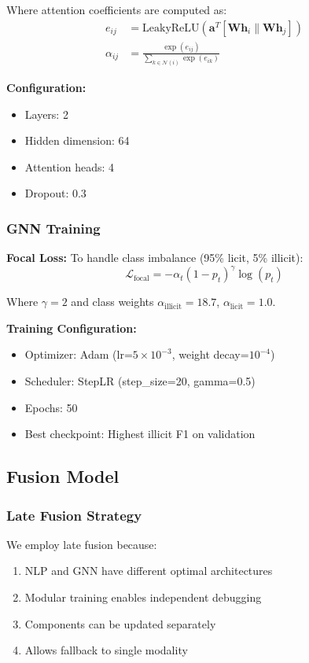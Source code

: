 Where attention coefficients are computed as:
\begin{align}
e_{ij} &= \text{LeakyReLU}\left(\mathbf{a}^T [\mathbf{W}\mathbf{h}_i \| \mathbf{W}\mathbf{h}_j]\right) \\
\alpha_{ij} &= \frac{\exp(e_{ij})}{\sum_{k \in \mathcal{N}(i)} \exp(e_{ik})}
\end{align}

\textbf{Configuration:}
\begin{itemize}
    \item Layers: 2
    \item Hidden dimension: 64
    \item Attention heads: 4
    \item Dropout: 0.3
\end{itemize}

\subsubsection{GNN Training}

\textbf{Focal Loss:} To handle class imbalance (95\% licit, 5\% illicit):
\begin{equation}
\mathcal{L}_{\text{focal}} = -\alpha_t (1 - p_t)^\gamma \log(p_t)
\end{equation}

Where $\gamma=2$ and class weights $\alpha_{\text{illicit}} = 18.7$, $\alpha_{\text{licit}} = 1.0$.

\textbf{Training Configuration:}
\begin{itemize}
    \item Optimizer: Adam (lr=$5 \times 10^{-3}$, weight decay=$10^{-4}$)
    \item Scheduler: StepLR (step\_size=20, gamma=0.5)
    \item Epochs: 50
    \item Best checkpoint: Highest illicit F1 on validation
\end{itemize}

\subsection{Fusion Model}

\subsubsection{Late Fusion Strategy}

We employ late fusion because:
\begin{enumerate}
    \item NLP and GNN have different optimal architectures
    \item Modular training enables independent debugging
    \item Components can be updated separately
    \item Allows fallback to single modality
\end{enumerate}

